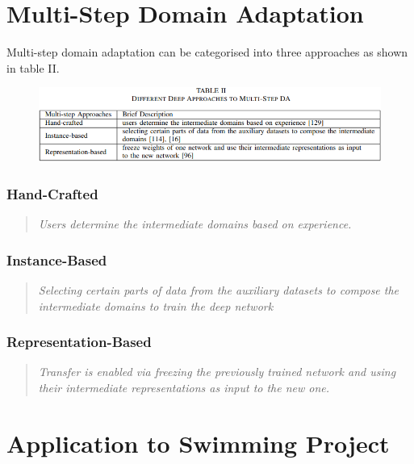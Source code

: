 \documentclass{report}
\newcommand{\quoteit}[1]{\begin{quote}\textit{#1}\end{quote}}
\begin{document}
\chapter*{Multi-Step Domain Adaptation}
Multi-step domain adaptation can be categorised into three approaches as shown in table II.
\begin{figure}[!h]
	\centering
	\includegraphics[width=14cm]{two-step-approaches}
	\label{fig:two-step-approaches:1}
\end{figure}
\subsection{Hand-Crafted}
\quoteit{Users determine the intermediate domains based on experience.}
\subsection{Instance-Based}
\quoteit{Selecting certain parts of data from the auxiliary datasets to compose the intermediate domains to train the deep network}
\subsection{Representation-Based}
\quoteit{Transfer is enabled via freezing the previously trained network and using their intermediate representations as input to the new one.}


\chapter*{Application to Swimming Project}

	
\end{document}
